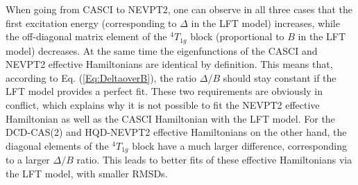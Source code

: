When going from CASCI to NEVPT2, one can observe in all three cases that the first excitation energy (corresponding to $\Delta $ in the LFT model) increases, while the off-diagonal matrix element of the $^4T_{1g}$ block (proportional to $B$ in the LFT model) decreases. At the same time the eigenfunctions of the CASCI and NEVPT2 effective Hamiltonians are identical by definition. This means that, according to Eq. (\ref{Eq:DeltaoverB}), the ratio $\Delta /B$ should stay constant if the LFT model provides a perfect fit. These two requirements are obviously in conflict, which explains why it is not possible to fit the NEVPT2 effective Hamiltonian as well as the CASCI Hamiltonian with the LFT model. For the DCD-CAS(2) and HQD-NEVPT2 effective Hamiltonians on the other hand, the diagonal elements of the $^4T_{1g}$ block have a much larger difference, corresponding to a larger $\Delta /B$ ratio. This leads to better fits of these effective Hamiltonians via the LFT model, with smaller RMSDs.

